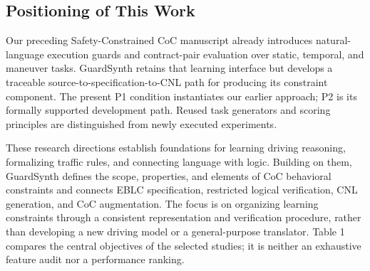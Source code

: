 \documentclass[nolineno]{ieeeaccess}
\begin{document}
\subsection{Positioning of This Work}

Our preceding Safety-Constrained CoC manuscript already introduces natural-language execution guards and contract-pair evaluation over static, temporal, and maneuver tasks. GuardSynth retains that learning interface but develops a traceable source-to-specification-to-CNL path for producing its constraint component. The present P1 condition instantiates our earlier approach; P2 is its formally supported development path. Reused task generators and scoring principles are distinguished from newly executed experiments. \cite{r4}\par

These research directions establish foundations for learning driving reasoning, formalizing traffic rules, and connecting language with logic. Building on them, GuardSynth defines the scope, properties, and elements of CoC behavioral constraints and connects EBLC specification, restricted logical verification, CNL generation, and CoC augmentation. The focus is on organizing learning constraints through a consistent representation and verification procedure, rather than developing a new driving model or a general-purpose translator. Table 1 compares the central objectives of the selected studies; it is neither an exhaustive feature audit nor a performance ranking.\par
\end{document}

